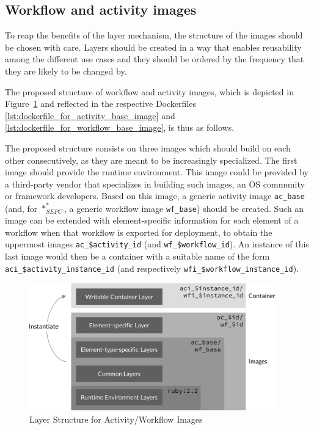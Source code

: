 
\subsection{Workflow and activity images} %
\label{sub:workflow_activity_images}
  To reap the benefits of the layer mechanism, the structure of the images should be chosen with care. Layers should be created in a way that enables reusability among the different use cases and they should be ordered by the frequency that they are likely to be changed by.

  The proposed structure of workflow and activity images, which is depicted in Figure~\ref{fig:layers_for_element_wrapping_containers} and reflected in the respective Dockerfiles \ref{lst:dockerfile_for_activity_base_image} and \ref{lst:dockerfile_for_workflow_base_image}, is thus as follows.

  The proposed structure consists on three images which should build on each other consecutively, as they are meant to be increasingly specialized. The first image should provide the runtime environment. This image could be provided by a third-party vendor that specializes in building such images, \ie an \ac{OS} community or framework developers. Based on this image, a generic activity image \texttt{ac\_base} (and, for $*_{SEPC}^{*}$, a generic workflow image \texttt{wf\_base}) should be created. Such an image can be extended with element-specific information for each element of a workflow when that workflow is exported for deployment, to obtain the uppermost images \texttt{ac\_\$activity\_id} (and \texttt{wf\_\$workflow\_id}). An instance of this last image would then be a container with a suitable name of the form \texttt{aci\_\$activity\_instance\_id} (and respectively \texttt{wfi\_\$workflow\_instance\_id}).

  \begin{figure}[htbp]
    \centering
    \includegraphics[width=0.95\textwidth]{content/images/layer_concept-crop.pdf}
    \caption{Layer Structure for Activity/Workflow Images}
    \label{fig:layers_for_element_wrapping_containers}
  \end{figure}

